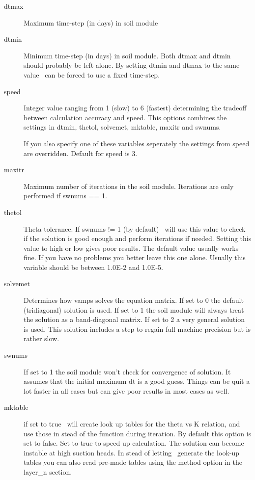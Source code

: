\begin{description}
\item[dtmax]
Maximum time-step (in days) in soil module

\item[dtmin]
Minimum time-step (in days) in soil module. Both dtmax and dtmin
should probably be left alone. By setting dtmin and dtmax to the 
same value \vamps\ can be forced to use a fixed time-step.


\item[speed]
Integer value ranging from 1 (slow) to 6 (fastest) determining
the tradeoff between calculation accuracy and speed. This options
combines the settings in dtmin, thetol, solvemet, mktable,
maxitr and swnums.

If you also specify one of these variables seperately the settings
from speed are overridden. Default  for speed is 3.

\item[maxitr]
Maximum number of iterations in the soil module. Iterations
are only performed if swnums == 1.

\item[thetol]
Theta tolerance. If swnums != 1 (by default) 
\vamps\
will use this value to check if the solution is good enough and
perform iterations if needed. Setting this value to high or low
gives poor results. The default value usually works fine. If
you have no problems you better leave this one alone. Usually
this variable should be between 1.0E-2 and 1.0E-5.

\item[solvemet]
Determines how vamps solves the equation matrix.
If set to 0 the default (tridiagonal) solution is used.
If set to 1 the soil module will always treat the solution as a band-diagonal
matrix. If set to 2 a very general solution is used. This solution
includes a step to regain full machine precision but is rather slow.

\item[swnums]
If set to 1 the soil module won't check for convergence of solution.
It assumes that the initial maximum dt is a good guess. Things can be
quit a lot faster in all cases but can give poor results in most cases
as well.

\item[mktable]
if set to true 
\vamps\
will create look up tables for the theta vs K relation, and use those
in stead of the function during iteration.  By default this option is
set to false. Set to true to speed up calculation. The solution can
become instable at high suction heads. In stead of letting 
\vamps\
generate the look-up tables you can also read pre-made tables
using the method option in the layer\_n section.



\end{description}
